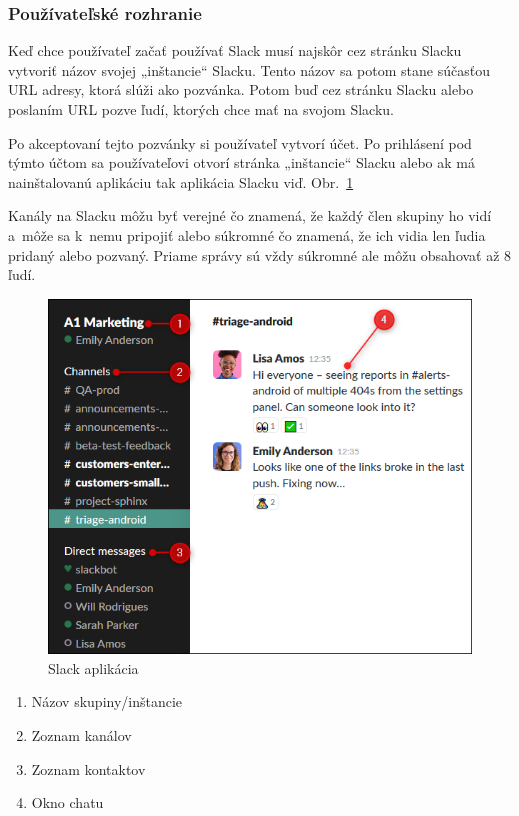 \subsubsection{Používateľské rozhranie}
\indent Keď chce používateľ začať používať Slack musí najskôr cez stránku Slacku vytvoriť názov svojej „inštancie“ Slacku. Tento názov sa potom stane súčasťou URL adresy, ktorá slúži ako pozvánka. Potom buď cez stránku Slacku alebo poslaním URL pozve ľudí, ktorých chce mať na svojom Slacku. 

\indent Po akceptovaní tejto pozvánky si používateľ vytvorí účet. Po prihlásení pod týmto účtom sa používateľovi otvorí stránka „inštancie“ Slacku alebo ak má nainštalovanú aplikáciu tak aplikácia Slacku viď. Obr.~\ref{fig:img-slack-app}

\indent Kanály na Slacku môžu byť verejné čo znamená, že každý člen skupiny ho vidí a môže sa k nemu pripojiť alebo súkromné čo znamená, že ich vidia len ľudia pridaný alebo pozvaný. Priame správy sú vždy súkromné ale môžu obsahovať až 8 ľudí.

\begin{figure}[H]
    \centering
    \includegraphics[scale=0.80]{img/obr1.png}
    \caption{Slack aplikácia}
    \label{fig:img-slack-app}
\end{figure}
\begin{enumerate}
    \centering
    \item Názov skupiny/inštancie
    \item Zoznam kanálov 
    \item Zoznam kontaktov
    \item Okno chatu
\end{enumerate}


